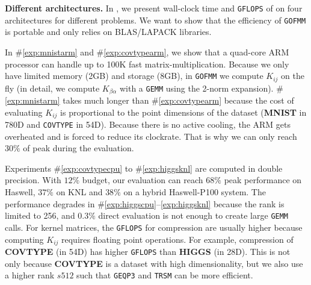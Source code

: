 \textbf{Different architectures.}
In , we present wall-clock time and \texttt{GFLOPS}
of \gofmm{} on four architectures for different problems.
We want to show that the efficiency of \texttt{GOFMM} is
portable and only relies on BLAS/LAPACK libraries.  

In \#\ref{exp:mnistarm} and \#\ref{exp:covtypearm},
we show that a quad-core ARM processor can handle
up to 100K fast matrix-multiplication. Because we only have limited 
memory (2GB) and storage (8GB), in \texttt{GOFMM} we
compute $K_{ij}$ on the fly (in detail, we compute
$K_{\beta\alpha}$ with a \texttt{GEMM} using the 2-norm expansion).
\#\ref{exp:mnistarm} takes much longer than \#\ref{exp:covtypearm}
because the cost of evaluating $K_{ij}$ is proportional to the point dimensions
of the dataset (\textbf{MNIST} in 780D and \texttt{COVTYPE} in 54D).
Because there is no active cooling, the ARM gets overheated and is
forced to reduce its clockrate. That is why we can only reach $30\%$ of peak
during the evaluation. 

Experiments \#\ref{exp:covtypecpu} to \#\ref{exp:higgsknl} are computed
in double precision. %
With $12\%$ budget,
our evaluation can reach $68\%$ peak performance on Haswell, $37\%$ on KNL and $38\%$ 
on a hybrid Haswell-P100 system.
The performance degrades in \#\ref{exp:higgscpu}--\ref{exp:higgsknl} because
the rank is limited to 256, and $0.3\%$ direct evaluation 
is not enough to create large \texttt{GEMM} calls.
For kernel matrices, the \texttt{GFLOPS} for compression are usually
higher because computing $K_{ij}$ requires floating point operations.
For example, compression of \textbf{COVTYPE} (in 54D) has higher 
\texttt{GFLOPS} than \textbf{HIGGS} (in 28D).
This is not only because \textbf{COVTYPE} is a dataset with high 
dimensionality, but we also use a higher rank $s512$ such that 
\texttt{GEQP3} and \texttt{TRSM} can be more efficient.


